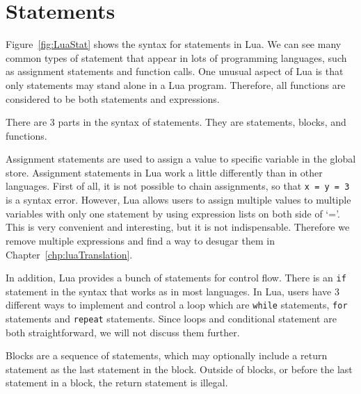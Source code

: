 \section{Statements}
Figure~\ref{fig:LuaStat} shows the syntax for statements in Lua. We can see many common types of statement that appear in lots of programming languages, such as assignment statements and function calls.
One unusual aspect of Lua is that only statements may stand alone in a Lua program.
Therefore, all functions are considered to be both statements and expressions.

There are 3 parts in the syntax of statements.
They are statements, blocks, and functions.

Assignment statements are used to assign a value to specific variable in the global store.
Assignment statements in Lua work a little differently than in other languages.
First of all, it is not possible to chain assignments, so that {\tt x = y = 3} is a syntax error.
However, Lua allows users to assign multiple values to multiple variables with only one statement by using expression lists on both side of `='. This is very convenient and interesting, but it is not indispensable. Therefore we remove multiple expressions and find a way to desugar them in Chapter~\ref{chp:luaTranslation}.

In addition, Lua provides a bunch of statements for control flow. There is an {\tt if} statement in the syntax that works as in most languages.
In Lua, users have 3 different ways to implement and control a loop which are {\tt while} statements, {\tt for} statements and {\tt repeat} statements. Since loops and conditional statement are both straightforward, we will not discuss them further.

Blocks are a sequence of statements,
which may optionally include a return statement as the last statement in the block.
Outside of blocks, or before the last statement in a block,
the return statement is illegal.

